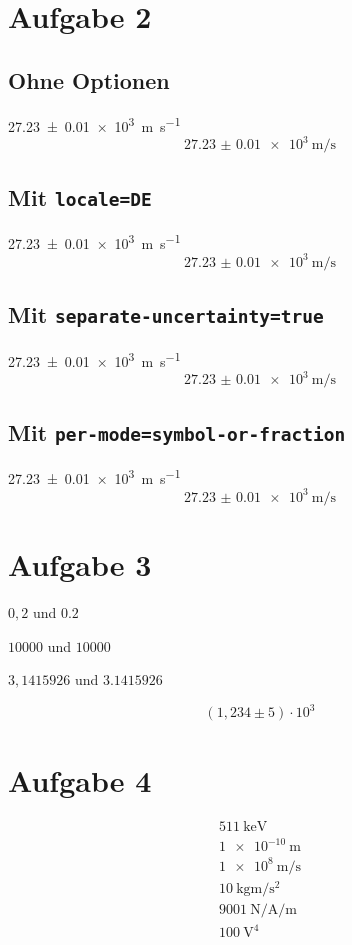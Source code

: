 \documentclass{scrartcl}
\begin{document}
\section*{Aufgabe 2}
\subsection*{Ohne Optionen}
\SI{27.23(1)e3}{\meter\per\second}
\begin{equation}
  \SI{27.23(1)e3}{\meter\per\second} 
\end{equation}

\subsection*{Mit \texttt{locale=DE}}
\SI{27.23(1)e3}{\meter\per\second}
\begin{equation}
  \SI{27.23(1)e3}{\meter\per\second} 
\end{equation}

\subsection*{Mit \texttt{separate-uncertainty=true}}
\SI{27.23(1)e3}{\meter\per\second}
\begin{equation}
  \SI{27.23(1)e3}{\meter\per\second} 
\end{equation}

\subsection*{Mit \texttt{per-mode=symbol-or-fraction}}
\SI{27.23(1)e3}{\meter\per\second}
\begin{equation} 
  \SI{27.23(1)e3}{\meter\per\second} 
\end{equation}

\section*{Aufgabe 3}
$0,2$ und $\num{0,2}$

$10000$ und $\num{10000}$

$3,1415926$ und $\num{3,1415926}$

\begin{equation}
  (1,\!234 \pm 5)\cdot 10^3
\end{equation}

\section*{Aufgabe 4}

\begin{gather}
  \SI{511}{\kilo\electronvolt} \\
  \SI{1e-10}{\metre} \\
  \SI{1e8}{\metre\per\second} \\
  \SI{10}{\kilo\gram\metre\per\square\second} \\
  \SI{9001}{\newton\per\ampere\per\metre} \\
  \SI{100}{\volt\tothe{4}}
\end{gather}
\end{document}
